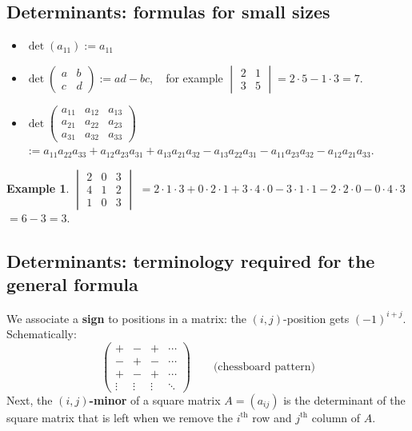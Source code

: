 \documentclass[
  english,
  12pt,
  oneside]{book}
\providecommand{\tightlist}{%
  \setlength{\itemsep}{0pt}\setlength{\parskip}{0pt}}
\theoremstyle{definition}
\theoremstyle{definition}
\newtheorem{example}{Example}[chapter]
\theoremstyle{definition}
\theoremstyle{definition}
\theoremstyle{remark}
\begin{document}
\subsection{Determinants: formulas for small sizes}\label{determinants-formulas-for-small-sizes}

\begin{itemize}
\tightlist
\item
  \(\det(a_{11}) := a_{11}\)
\item
  \(\det\begin{pmatrix}a&b\\c&d\end{pmatrix} := ad-bc\), ~ for example \(\begin{vmatrix}2&1\\3&5\end{vmatrix}=2\cdot 5-1\cdot 3=7\).
\item
  \(\det
        \begin{pmatrix}
            a_{11} & a_{12} & a_{13}\\
            a_{21} & a_{22} & a_{23}\\
            a_{31} & a_{32} & a_{33}
        \end{pmatrix}\)
  \(:= a_{11}a_{22}a_{33} + a_{12}a_{23}a_{31} + a_{13}a_{21}a_{32}
        - a_{13}a_{22}a_{31} - a_{11}a_{23}a_{32} - a_{12}a_{21}a_{33}\).
\end{itemize}

\begin{example}
\protect\hypertarget{exm:unnamed-chunk-48}{}\label{exm:unnamed-chunk-48}\(\begin{vmatrix}2&0&3\\ 4&1&2\\ 1&0&3\end{vmatrix}\)
\(=2\cdot1\cdot3+0\cdot2\cdot1 + 3\cdot4\cdot0 - 3\cdot1\cdot1 - 2\cdot2\cdot0 - 0\cdot4\cdot3\)
\(=6-3=3\).
\end{example}

\subsection{Determinants: terminology required for the general formula}\label{determinants-terminology-required-for-the-general-formula}

We associate a \textbf{sign} to positions in a matrix: the
\((i,j)\)-position gets \((-1)^{i+j}\). Schematically:
\[\begin{pmatrix} + & - & + & \cdots \\
    - & + & - & \cdots\\
    + & - & + & \cdots\\
\vdots & \vdots & \vdots & \ddots\end{pmatrix}
\qquad\text{(chessboard pattern)}\]
Next, the \textbf{\((i,j)\)-minor} of a square matrix \(A=(a_{ij})\) is the determinant of the square matrix that is left when we remove the \(i^\text{th}\) row and \(j^\text{th}\) column of \(A\).
\end{document}
